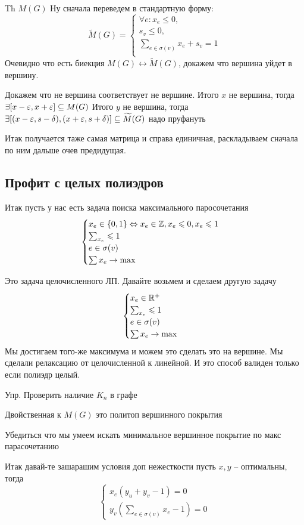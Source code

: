 Th $M(G)$
Ну сначала переведем в стандартную форму:
\[
	\widetilde{M}(G) = \begin{cases}
		\forall e: x_e \leq 0,\\
		s_v \leq 0,\\
		\sum_{e \in \sigma(v)} x_e + s_v = 1\\
	\end{cases}
\]
 Очевидно что есть биекция $M(G) \leftrightarrow \widetilde{M}(G)$, докажем что вершина уйдет в вершину.

 Докажем что не вершина соответствует не вершине.
 Итого $x$ не вершина, тогда $\exists [x - \varepsilon, x + \varepsilon] \subseteq M(G)$
 Итого $y$ не вершина, тогда $\exists [(x - \varepsilon, s - \delta), (x + \varepsilon, s + \delta)] \subseteq \widetilde{M}(G)$
 надо пруфануть

 Итак получается таже самая матрица и справа единичная, раскладываем сначала по ним дальше очев предидущая.

 \subsection{Профит с целых полиэдров}
 Итак пусть у нас есть задача поиска максимального паросочетания
 \[
 \begin{cases}
 	x_e \in \{0, 1\} \Leftrightarrow x_e \in \mathbb{Z}, x_e \leqslant 0, x_e \leqslant 1\\
 	\sum_{x_e} \leqslant 1\\
 	e \in \sigma(v)\\
 	\sum x_e \to \max
 \end{cases}
 \]

 Это задача целочисленного ЛП. Давайте возьмем и сделаем другую задачу
 \[
 \begin{cases}
 	x_e \in \mathbb{R}^+ \\
 	\sum_{x_e} \leqslant 1\\
 	e \in \sigma(v)\\
 	\sum x_e \to \max
 \end{cases}
 \]
 Мы достигаем того-же максимума и можем это сделать это на вершине.
 Мы сделали релаксацию от целочисленной к линейной. И это способ валиден только если полиэдр целый.

 Упр. 
 Проверить наличие $K_{n}$ в графе


Двойственная к $M(G)$ это политоп вершинного покрытия

Убедиться что мы умеем искать минимальное вершинное покрытие по макс парасочетанию

Итак давай-те зашарашим условия доп нежесткости
пусть $x, y$ -- оптимальны, тогда
\[
	\begin{cases}
		x_e (y_u + y_v - 1) = 0\\
		y_v (\sum_{e\in\sigma(v)}x_e - 1) = 0
	\end{cases}
\]


